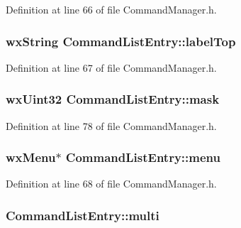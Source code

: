 Definition at line 66 of file Command\+Manager.\+h.

\subsubsection[{\texorpdfstring{label\+Top}{labelTop}}]{\setlength{\rightskip}{0pt plus 5cm}wx\+String Command\+List\+Entry\+::label\+Top}\hypertarget{struct_command_list_entry_a05ee028e2768d637b889608f9fd3a81c}{}\label{struct_command_list_entry_a05ee028e2768d637b889608f9fd3a81c}


Definition at line 67 of file Command\+Manager.\+h.

\subsubsection[{\texorpdfstring{mask}{mask}}]{\setlength{\rightskip}{0pt plus 5cm}wx\+Uint32 Command\+List\+Entry\+::mask}\hypertarget{struct_command_list_entry_a4d2702f79eb3dd92372b31bcfb84fa37}{}\label{struct_command_list_entry_a4d2702f79eb3dd92372b31bcfb84fa37}


Definition at line 78 of file Command\+Manager.\+h.

\subsubsection[{\texorpdfstring{menu}{menu}}]{\setlength{\rightskip}{0pt plus 5cm}wx\+Menu$\ast$ Command\+List\+Entry\+::menu}\hypertarget{struct_command_list_entry_a47f5b565dc30e1334ef24847919826a3}{}\label{struct_command_list_entry_a47f5b565dc30e1334ef24847919826a3}


Definition at line 68 of file Command\+Manager.\+h.

\subsubsection[{\texorpdfstring{multi}{multi}}]{ Command\+List\+Entry\+::multi}\hypertarget{struct_command_list_entry_a3f3558e5787c5409bb5f2ed0039d3633}{}\label{struct_command_list_entry_a3f3558e5787c5409bb5f2ed0039d3633}



